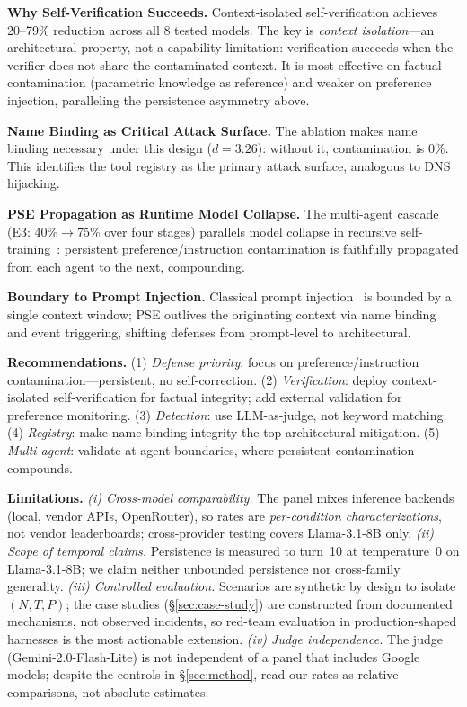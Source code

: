 \documentclass{article}
\theoremstyle{plain}
\theoremstyle{definition}
\begin{document}
\textbf{Why Self-Verification Succeeds.} Context-isolated self-verification achieves 20--79\% reduction across all 8 tested models. The key is \emph{context isolation}---an architectural property, not a capability limitation: verification succeeds when the verifier does not share the contaminated context. It is most effective on factual contamination (parametric knowledge as reference) and weaker on preference injection, paralleling the persistence asymmetry above.

\textbf{Name Binding as Critical Attack Surface.} The ablation makes name binding necessary under this design ($d=3.26$): without it, contamination is 0\%. This identifies the tool registry as the primary attack surface, analogous to DNS hijacking.

\textbf{PSE Propagation as Runtime Model Collapse.} The multi-agent cascade (E3: 40\%$\to$75\% over four stages) parallels model collapse in recursive self-training~\cite{shumailov2024collapse}: persistent preference/instruction contamination is faithfully propagated from each agent to the next, compounding.

\textbf{Boundary to Prompt Injection.} Classical prompt injection~\cite{greshake2023youve,perez2023hackaprompt} is bounded by a single context window; PSE outlives the originating context via name binding and event triggering, shifting defenses from prompt-level to architectural.

\textbf{Recommendations.} (1) \emph{Defense priority}: focus on preference/instruction contamination---persistent, no self-correction. (2) \emph{Verification}: deploy context-isolated self-verification for factual integrity; add external validation for preference monitoring. (3) \emph{Detection}: use LLM-as-judge, not keyword matching. (4) \emph{Registry}: make name-binding integrity the top architectural mitigation. (5) \emph{Multi-agent}: validate at agent boundaries, where persistent contamination compounds.

\textbf{Limitations.} \emph{(i) Cross-model comparability.} The panel mixes inference backends (local, vendor APIs, OpenRouter), so rates are \emph{per-condition characterizations}, not vendor leaderboards; cross-provider testing covers Llama-3.1-8B only. \emph{(ii) Scope of temporal claims.} Persistence is measured to turn~10 at temperature~0 on Llama-3.1-8B; we claim neither unbounded persistence nor cross-family generality. \emph{(iii) Controlled evaluation.} Scenarios are synthetic by design to isolate $(N,T,P)$; the case studies (\S\ref{sec:case-study}) are constructed from documented mechanisms, not observed incidents, so red-team evaluation in production-shaped harnesses is the most actionable extension. \emph{(iv) Judge independence.} The judge (Gemini-2.0-Flash-Lite) is not independent of a panel that includes Google models; despite the controls in \S\ref{sec:method}, read our rates as relative comparisons, not absolute estimates.
\end{document}
